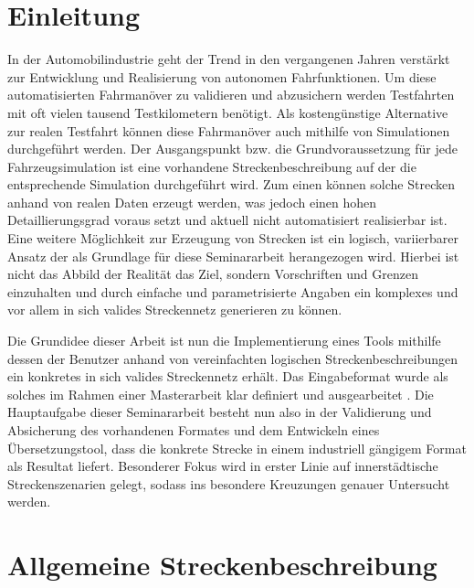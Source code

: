 \thispagestyle{ika}

\chapter{Einleitung}

In der Automobilindustrie geht der Trend in den vergangenen Jahren verstärkt  zur Entwicklung und Realisierung von autonomen Fahrfunktionen. Um diese automatisierten Fahrmanöver zu validieren und abzusichern werden Testfahrten mit oft vielen tausend Testkilometern benötigt. Als kostengünstige Alternative zur realen Testfahrt können diese Fahrmanöver auch mithilfe von Simulationen durchgeführt werden. Der Ausgangspunkt bzw. die Grundvoraussetzung für jede Fahrzeugsimulation ist eine vorhandene Streckenbeschreibung auf der die entsprechende Simulation durchgeführt wird. Zum einen können solche Strecken anhand von realen Daten erzeugt werden, was jedoch einen hohen Detaillierungsgrad voraus setzt und aktuell nicht automatisiert realisierbar ist. Eine weitere Möglichkeit zur Erzeugung von Strecken ist ein logisch, variierbarer Ansatz der als Grundlage für diese Seminararbeit herangezogen wird. Hierbei ist nicht das Abbild der Realität das Ziel, sondern Vorschriften und Grenzen einzuhalten und durch einfache und parametrisierte Angaben ein komplexes und vor allem in sich valides Streckennetz generieren zu können.

Die Grundidee dieser Arbeit ist nun die Implementierung eines Tools mithilfe dessen der Benutzer anhand von vereinfachten logischen Streckenbeschreibungen ein konkretes in sich valides Streckennetz erhält. Das Eingabeformat wurde als solches im Rahmen einer Masterarbeit klar definiert und ausgearbeitet \cite{Russ.2019}. Die Hauptaufgabe dieser Seminararbeit besteht nun also in der Validierung und Absicherung des vorhandenen Formates und dem Entwickeln eines Übersetzungstool, dass die konkrete Strecke in einem industriell gängigem Format als Resultat liefert. Besonderer Fokus wird in erster Linie auf innerstädtische Streckenszenarien gelegt, sodass ins besondere Kreuzungen genauer Untersucht werden. 

\chapter{Allgemeine Streckenbeschreibung}


